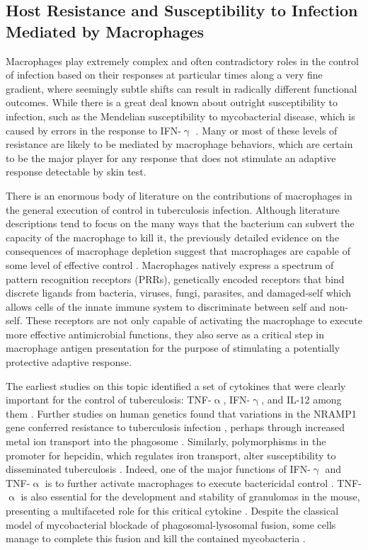 \subsection{Host Resistance and Susceptibility to Infection Mediated by Macrophages}\label{macsig}

Macrophages play extremely complex and often contradictory roles in the control of infection based on their responses at particular times along a very fine gradient, where seemingly subtle shifts can result in radically different functional outcomes. While there is a great deal known about outright susceptibility to infection, such as the Mendelian susceptibility to mycobacterial disease, which is caused by errors in the response to IFN\hyp{}$\upgamma$ \citep{Bustamante2014}. Many or most of these levels of resistance are likely to be mediated by macrophage behaviors, which are certain to be the major player for any response that does not stimulate an adaptive response detectable by skin test.

There is an enormous body of literature on the contributions of macrophages in the general execution of control in tuberculosis infection. Although literature descriptions tend to focus on the many ways that the bacterium can subvert the capacity of the macrophage to kill it, the previously detailed evidence on the consequences of macrophage depletion suggest that macrophages are capable of some level of effective control \citep{Pagan2015}. Macrophages natively express a spectrum of pattern recognition receptors (PRRs), genetically encoded receptors that bind discrete ligands from bacteria, viruses, fungi, parasites, and damaged\hyp{}self which allows cells of the innate immune system to discriminate between self and non\hyp{}self. These receptors are not only capable of activating the macrophage to execute more effective antimicrobial functions, they also serve as a critical step in macrophage antigen presentation for the purpose of stimulating a potentially protective adaptive response. 

The earliest studies on this topic identified a set of cytokines that were clearly important for the control of tuberculosis: TNF\hyp{}$\upalpha$, IFN\hyp{}$\upgamma$, and IL\hyp{}12 among them \citep{Flynn1993, Flynn1995, Cooper1993, Cooper1997}. Further studies on human genetics found that variations in the NRAMP1 gene conferred resistance to tuberculosis infection \citep{Bellamy1998}, perhaps through increased metal ion transport into the phagosome \citep{Davies2001a}. Similarly, polymorphisms in the promoter for hepcidin, which regulates iron transport, alter susceptibility to disseminated tuberculosis \citep{Liang2017}. Indeed, one of the major functions of IFN\hyp{}$\upgamma$ and TNF\hyp{}$\upalpha$ is to further activate macrophages to execute bactericidal control \citep{Kaufmann2002}. TNF\hyp{}$\upalpha$ is also essential for the development and stability of granulomas in the mouse, presenting a multifaceted role for this critical cytokine \citep{Chakravarty2008}. Despite the classical model of mycobacterial blockade of phagosomal\hyp{}lysosomal fusion, some cells manage to complete this fusion and kill the contained mycobacteria \citep{Kaufmann2002}. 

